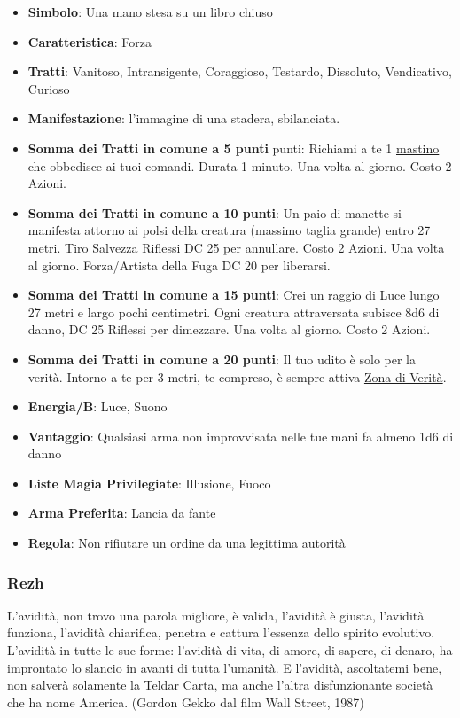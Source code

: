 \begin{multicols}{2}
\begin{itemize}[leftmargin=*] \setlength{\itemsep}{0pt}
\item \textbf{Simbolo}: Una mano stesa su un libro chiuso
\item \textbf{Caratteristica}: Forza
\item \textbf{Tratti}: Vanitoso, Intransigente, Coraggioso, Testardo, Dissoluto, Vendicativo, Curioso
\item \textbf{Manifestazione}: l'immagine di una stadera, sbilanciata.
\item \textbf{Somma dei Tratti in comune a 5 punti} punti: Richiami a te 1 \hyperlink{Mastino}{mastino} che obbedisce ai tuoi comandi. Durata 1 minuto. Una volta al giorno. Costo 2 Azioni.
\item \textbf{Somma dei Tratti in comune a 10 punti}: Un paio di manette si manifesta attorno ai polsi della creatura (massimo taglia grande) entro 27 metri. Tiro Salvezza Riflessi DC 25 per annullare. Costo 2 Azioni. Una volta al giorno. Forza/Artista della Fuga DC 20 per liberarsi.
\item \textbf{Somma dei Tratti in comune a 15 punti}: Crei un raggio di Luce lungo 27 metri e largo pochi centimetri. Ogni creatura attraversata subisce 8d6 di danno, DC 25 Riflessi per dimezzare. Una volta al giorno. Costo 2 Azioni.
\item \textbf{Somma dei Tratti in comune a 20 punti}: Il tuo udito è solo per la verità. Intorno a te per 3 metri, te compreso, è sempre attiva \hyperlink{Zona di Verità}{Zona di Verità}.
\item \textbf{Energia/B}: Luce, Suono
\item \textbf{Vantaggio}: Qualsiasi arma non improvvisata nelle tue mani fa almeno 1d6 di danno
\item \textbf{Liste Magia Privilegiate}: Illusione, Fuoco
\item \textbf{Arma Preferita}: Lancia da fante
\item \textbf{Regola}: Non rifiutare un ordine da una legittima autorità
\end{itemize}

\subsubsection{Rezh}\label{rezh}\hypertarget{rezh}{}

\begin{enfasi}{
L'avidità, non trovo una parola migliore, è valida, l'avidità è giusta, l'avidità funziona, l'avidità chiarifica, penetra e cattura l'essenza dello spirito evolutivo. L'avidità in tutte le sue forme: l'avidità di vita, di amore, di sapere, di denaro, ha improntato lo slancio in avanti di tutta l'umanità. E l'avidità, ascoltatemi bene, non salverà solamente la Teldar Carta, ma anche l'altra disfunzionante società che ha nome America. (Gordon Gekko dal film Wall Street, 1987)
}\end{enfasi}


\end{multicols}

